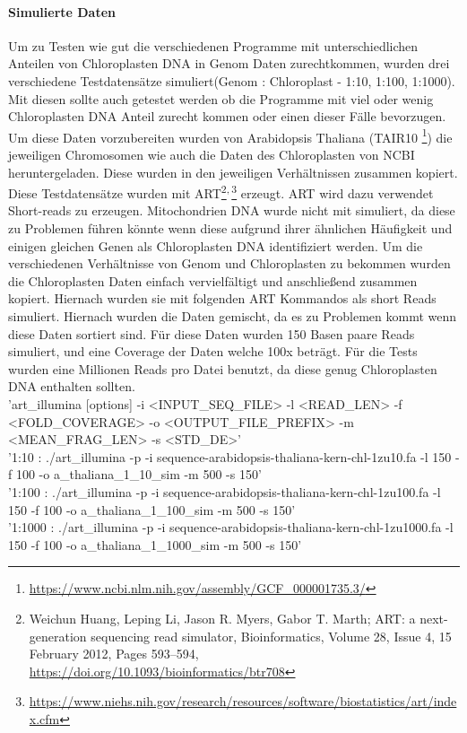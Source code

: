 \documentclass{scrartcl}
\begin{document}
\paragraph{Simulierte Daten}
\label{sec-3-1-1-1}
Um zu Testen wie gut die verschiedenen Programme mit unterschiedlichen Anteilen von Chloroplasten DNA in
Genom Daten zurechtkommen, wurden drei verschiedene Testdatensätze simuliert(Genom : Chloroplast - 1:10, 1:100, 1:1000). 
Mit diesen sollte auch getestet werden ob die Programme mit viel oder wenig Chloroplasten DNA Anteil zurecht kommen oder einen dieser Fälle 
bevorzugen. Um diese Daten vorzubereiten wurden von Arabidopsis Thaliana (TAIR10 \footnote{\url{https://www.ncbi.nlm.nih.gov/assembly/GCF_000001735.3/}}) die jeweiligen Chromosomen wie auch die Daten
des Chloroplasten von NCBI heruntergeladen. Diese wurden in den jeweiligen Verhältnissen zusammen kopiert.
Diese Testdatensätze wurden mit ART\footnote{Weichun Huang, Leping Li, Jason R. Myers, Gabor T. Marth; ART: a next-generation sequencing read simulator, Bioinformatics, Volume 28, Issue 4, 15 February 2012, Pages 593–594, \url{https://doi.org/10.1093/bioinformatics/btr708}}\textsuperscript{,}\,\footnote{\url{https://www.niehs.nih.gov/research/resources/software/biostatistics/art/index.cfm}} erzeugt. ART wird dazu verwendet Short-reads zu erzeugen. 
 Mitochondrien DNA wurde nicht mit simuliert, da diese zu 
Problemen führen könnte wenn diese aufgrund ihrer ähnlichen Häufigkeit und einigen gleichen Genen als Chloroplasten DNA identifiziert werden. 
Um die verschiedenen Verhältnisse von Genom und Chloroplasten zu bekommen wurden die Chloroplasten Daten einfach
vervielfältigt und anschließend zusammen kopiert. Hiernach wurden sie mit folgenden ART Kommandos als short Reads simuliert.
Hiernach wurden die Daten gemischt, da es zu Problemen kommt wenn diese Daten sortiert sind. Für diese Daten wurden 150 Basen paare Reads simuliert, 
und eine Coverage der Daten welche 100x beträgt. 
Für die Tests wurden eine Millionen Reads pro Datei benutzt, da diese genug Chloroplasten DNA enthalten sollten.
\\
'art\_illumina [options] -i <INPUT\_SEQ\_FILE> -l <READ\_LEN> -f <FOLD\_COVERAGE> -o <OUTPUT\_FILE\_PREFIX> -m <MEAN\_FRAG\_LEN> -s <STD\_DE>'
\\
'1:10 : ./art\_illumina -p -i sequence-arabidopsis-thaliana-kern-chl-1zu10.fa -l 150 -f 100 -o a\_thaliana\_1\_10\_sim -m 500 -s 150'
\\
'1:100 :  ./art\_illumina -p -i sequence-arabidopsis-thaliana-kern-chl-1zu100.fa -l 150 -f 100 -o a\_thaliana\_1\_100\_sim -m 500 -s 150'
\\
'1:1000 :  ./art\_illumina -p -i sequence-arabidopsis-thaliana-kern-chl-1zu1000.fa -l 150 -f 100 -o a\_thaliana\_1\_1000\_sim -m 500 -s 150'
\end{document}
